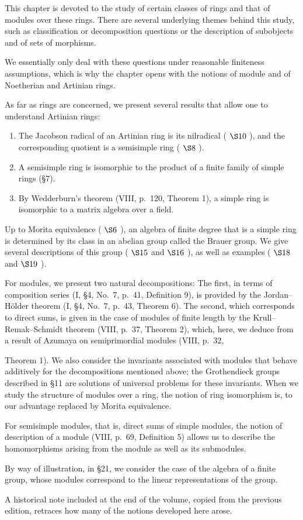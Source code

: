 
This chapter is devoted to the study of certain classes of rings and that of modules over these rings. There are several underlying themes behind this study, such as classification or decomposition questions or the description of subobjects and of sets of morphisms.

We essentially only deal with these questions under reasonable finiteness assumptions, which is why the chapter opens with the notions of module and of Noetherian and Artinian rings.

As far as rings are concerned, we present several results that allow one to understand Artinian rings:

\begin{enumerate}
\def\labelenumi{\alph{enumi})}
\item
  The Jacobson radical of an Artinian ring is its nilradical ( \(\S10\) ), and the corresponding quotient is a semisimple ring ( \(\S8\) ).
\item
  A semisimple ring is isomorphic to the product of a finite family of simple rings (§7).
\item
  By Wedderburn's theorem (VIII, p.~120, Theorem 1), a simple ring is isomorphic to a matrix algebra over a field.
\end{enumerate}

Up to Morita equivalence ( \(\S6\) ), an algebra of finite degree that is a simple ring is determined by its class in an abelian group called the Brauer group. We give several descriptions of this group ( \(\S15\) and \(\S16\) ), as well as examples ( \(\S18\) and \(\S19\) ).

For modules, we present two natural decompositions: The first, in terms of composition series (I, §4, No.~7, p.~41, Definition 9), is provided by the Jordan--Hölder theorem (I, §4, No.~7, p.~43, Theorem 6). The second, which corresponds to direct sums, is given in the case of modules of finite length by the Krull--Remak--Schmidt theorem (VIII, p.~37, Theorem 2), which, here, we deduce from a result of Azumaya on semiprimordial modules (VIII, p.~32,

Theorem 1). We also consider the invariants associated with modules that behave additively for the decompositions mentioned above; the Grothendieck groups described in §11 are solutions of universal problems for these invariants. When we study the structure of modules over a ring, the notion of ring isomorphism is, to our advantage replaced by Morita equivalence.

For semisimple modules, that is, direct sums of simple modules, the notion of description of a module (VIII, p.~69, Definition 5) allows us to describe the homomorphisms arising from the module as well as its submodules.

By way of illustration, in §21, we consider the case of the algebra of a finite group, whose modules correspond to the linear representations of the group.

A historical note included at the end of the volume, copied from the previous edition, retraces how many of the notions developed here arose.

\BourbakiMainMatter
\setcounter{chapter}{7}
